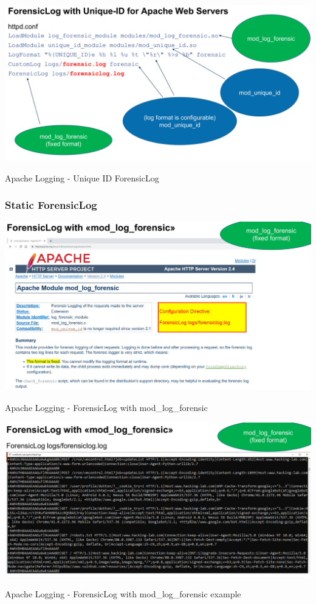 \begin{table}[h]
  \centering
  \includegraphics[width=\textwidth]{resources/12-apache-add-unique-id-to-log-2.png}
  \caption{Apache Logging - Unique ID ForensicLog}
\end{table}

\subsubsection{Static ForensicLog}

\begin{table}[h]
  \centering
  \includegraphics[width=\textwidth]{resources/12-apache-forensic-log.png}
  \caption{Apache Logging - ForensicLog with mod\_log\_forensic}
\end{table}

\begin{table}[h]
  \centering
  \includegraphics[width=\textwidth]{resources/12-apache-forensic-log-2.png}
  \caption{Apache Logging - ForensicLog with mod\_log\_forensic example}
\end{table}


